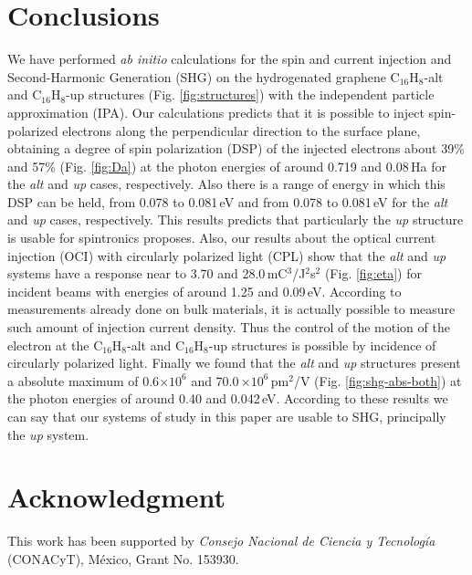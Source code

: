 \documentclass[pss]{wiley2sp} %
\begin{document}

\section{Conclusions} %
\label{sec:conclusions}

We have performed \emph{ab initio} calculations for the spin and current injection and
Second-Harmonic Generation (SHG) on the hydrogenated graphene C$_{16}$H$_{8}$-alt and
C$_{16}$H$_{8}$-up structures (Fig. \ref{fig:structures}) with the
independent particle approximation (IPA). Our calculations predicts that it is
possible to inject spin-polarized electrons along the perpendicular direction
to the surface plane, obtaining a degree of spin polarization (DSP) of the
injected electrons about 39\% and 57\%  (Fig. \ref{fig:Da}) at the photon energies of around 0.719
and 0.08\,Ha  for the \emph{alt} and \emph{up} cases, respectively. Also there is a range of energy
in which this DSP can be held, from 0.078 to 0.081\,eV and from 0.078 to 0.081\,eV for the \emph{alt} and \emph{up} cases, respectively. This results predicts that particularly
the \emph{up} structure is usable for spintronics proposes. Also, our results
about the optical current injection (OCI) with circularly polarized light (CPL)
show that the \emph{alt}  and \emph{up} systems have a response near to 3.70
and 28.0\,mC$^{3}$/J$^{2}$s$^{2}$ (Fig. \ref{fig:eta}) for incident beams with energies of around
1.25 and 0.09\,eV. According to measurements already done on bulk materials, it
is actually possible to measure such amount of injection current density. Thus 
the control of the motion of the electron at the
C$_{16}$H$_{8}$-alt and C$_{16}$H$_{8}$-up structures is possible by incidence of circularly
polarized light. Finally we found that the \emph{alt} and \emph{up} structures
present a absolute maximum of 0.6$\times 10^{6}$ and 70.0\,$\times 10^{6}
$\,pm$^{2}$/V (Fig. \ref{fig:shg-abs-both}) at the photon energies of around 0.40 and 0.042\,eV.
According to these results we can say that our systems of study in this paper are
usable to SHG, principally the \emph{up} system.


\section{Acknowledgment} %
\label{sec:Acknouledgment}

This work has been supported by \emph{Consejo Nacional de Ciencia y
Tecnolog\'ia} (CONACyT), M\'exico, Grant No. 153930.




\end{document}
